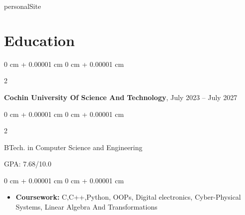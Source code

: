 personalSite\documentclass[10pt, letterpaper]{article}
\newenvironment{highlights}{
    \begin{itemize}[
        topsep=0.10 cm,
        parsep=0.10 cm,
        partopsep=0pt,
        itemsep=0pt,
        leftmargin=0 cm + 10pt
    ]
}{
    \end{itemize}
} %
\newenvironment{highlightsforbulletentries}{
    \begin{itemize}[
        topsep=0.10 cm,
        parsep=0.10 cm,
        partopsep=0pt,
        itemsep=0pt,
        leftmargin=10pt
    ]
}{
    \end{itemize}
} %
\newenvironment{onecolentry}{
    \begin{adjustwidth}{
        0 cm + 0.00001 cm
    }{
        0 cm + 0.00001 cm
    }
}{
    \end{adjustwidth}
} %
\newenvironment{twocolentry}[2][]{
    \onecolentry
    \def\secondColumn{#2}
    \setcolumnwidth{\fill, 4.5 cm}
    \begin{paracol}{2}
}{
    \switchcolumn \raggedleft \secondColumn
    \end{paracol}
    \endonecolentry
} %
\begin{document}
    









    \section{Education}



        
        \begin{twocolentry}{
            July 2023 – July 2027
        }
            \textbf{Cochin University Of Science And Technology}, \end{twocolentry}
            \begin{twocolentry}{
                GPA: 7.68/10.0
            }
                BTech. in Computer Science and Engineering
            \end{twocolentry}

        \vspace{0.10 cm}
        \begin{onecolentry}
            \begin{highlights}
                \item \textbf{Coursework:} C,C++,Python,  OOPs, Digital electronics, Cyber-Physical Systems, Linear Algebra And Transformations
            \end{highlights}
        \end{onecolentry}
\end{document}
